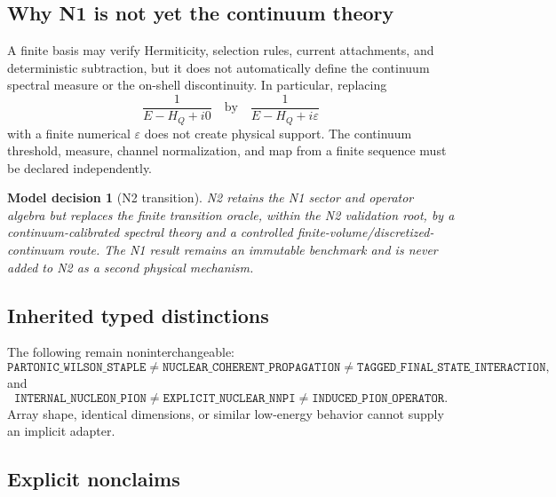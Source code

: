 \documentclass[11pt]{article}
\newtheorem{decision}[definition]{Model decision}
\newcommand{\eps}{\varepsilon}
\begin{document}
\subsection{Why N1 is not yet the continuum theory}

A finite basis may verify Hermiticity, selection rules, current attachments,
and deterministic subtraction, but it does not automatically define the
continuum spectral measure or the on-shell discontinuity.  In particular,
replacing
\begin{equation}
 \frac{1}{E-H_Q+i0}
 \quad\text{by}\quad
 \frac{1}{E-H_Q+i\eps}
 \label{eq:epsilon-not-support}
\end{equation}
with a finite numerical \(\eps\) does not create physical support.  The
continuum threshold, measure, channel normalization, and map from a finite
sequence must be declared independently.

\begin{decision}[N2 transition]
N2 retains the N1 sector and operator algebra but replaces the finite
transition oracle, within the N2 validation root, by a continuum-calibrated
spectral theory and a controlled finite-volume/discretized-continuum route.
The N1 result remains an immutable benchmark and is never added to N2 as a
second physical mechanism.
\end{decision}

\subsection{Inherited typed distinctions}

The following remain noninterchangeable:
\begin{equation}
 \texttt{PARTONIC\_WILSON\_STAPLE}
 \neq
 \texttt{NUCLEAR\_COHERENT\_PROPAGATION}
 \neq
 \texttt{TAGGED\_FINAL\_STATE\_INTERACTION},
 \label{eq:rescattering-types}
\end{equation}
and
\begin{equation}
 \texttt{INTERNAL\_NUCLEON\_PION}
 \neq
 \texttt{EXPLICIT\_NUCLEAR\_NNPI}
 \neq
 \texttt{INDUCED\_PION\_OPERATOR}.
 \label{eq:pion-types}
\end{equation}
Array shape, identical dimensions, or similar low-energy behavior cannot
supply an implicit adapter.

\subsection{Explicit nonclaims}
\end{document}
